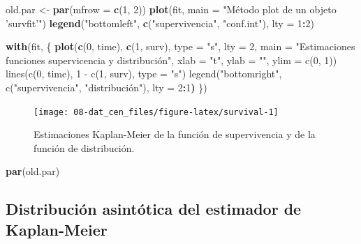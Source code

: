 \documentclass[]{book}
\newenvironment{Shaded}{\begin{snugshade}}{\end{snugshade}}
\newcommand{\KeywordTok}[1]{\textcolor[rgb]{0.13,0.29,0.53}{\textbf{#1}}}
\newcommand{\DataTypeTok}[1]{\textcolor[rgb]{0.13,0.29,0.53}{#1}}
\newcommand{\DecValTok}[1]{\textcolor[rgb]{0.00,0.00,0.81}{#1}}
\newcommand{\StringTok}[1]{\textcolor[rgb]{0.31,0.60,0.02}{#1}}
\newcommand{\OperatorTok}[1]{\textcolor[rgb]{0.81,0.36,0.00}{\textbf{#1}}}
\newcommand{\ErrorTok}[1]{\textcolor[rgb]{0.64,0.00,0.00}{\textbf{#1}}}
\newcommand{\NormalTok}[1]{#1}
\theoremstyle{definition}
\theoremstyle{definition}
\theoremstyle{definition}
\theoremstyle{remark}
\begin{document}
\begin{Shaded}
\begin{Highlighting}[]
\NormalTok{old.par <-}\StringTok{ }\KeywordTok{par}\NormalTok{(}\DataTypeTok{mfrow =} \KeywordTok{c}\NormalTok{(}\DecValTok{1}\NormalTok{, }\DecValTok{2}\NormalTok{))}
\KeywordTok{plot}\NormalTok{(fit, }\DataTypeTok{main =} \StringTok{"Método plot de un objeto 'survfit'"}\NormalTok{)}
\KeywordTok{legend}\NormalTok{(}\StringTok{"bottomleft"}\NormalTok{,  }\KeywordTok{c}\NormalTok{(}\StringTok{"supervivencia"}\NormalTok{, }\StringTok{"conf.int"}\NormalTok{), }\DataTypeTok{lty =} \DecValTok{1}\OperatorTok{:}\DecValTok{2}\NormalTok{)}

\KeywordTok{with}\NormalTok{(fit, \{}
  \KeywordTok{plot}\NormalTok{(}\KeywordTok{c}\NormalTok{(}\DecValTok{0}\NormalTok{, time), }\KeywordTok{c}\NormalTok{(}\DecValTok{1}\NormalTok{, surv), }\DataTypeTok{type =} \StringTok{"s"}\NormalTok{, }\DataTypeTok{lty =} \DecValTok{2}\NormalTok{,}
       \DataTypeTok{main =} \StringTok{"Estimaciones funciones supervicencia y distribución", }
\StringTok{       xlab = "}\NormalTok{t}\StringTok{", ylab = "", ylim = c(0, 1))}
\StringTok{  lines(c(0, time), 1 - c(1, surv), type = "}\NormalTok{s}\StringTok{")}
\StringTok{  legend("}\NormalTok{bottomright}\StringTok{",  c("}\NormalTok{supervivencia}\StringTok{", "}\NormalTok{distribución"), lty =}\StringTok{ }\DecValTok{2}\OperatorTok{:}\DecValTok{1}\ErrorTok{)}
\NormalTok{\})}
\end{Highlighting}
\end{Shaded}

\begin{figure}[!htb]

{\centering \texttt{[image: 08-dat\_cen\_files/figure-latex/survival-1]} 

}

\caption{Estimaciones Kaplan-Meier de la función de supervivencia y de la función de distribución.}\label{fig:survival}
\end{figure}

\begin{Shaded}
\begin{Highlighting}[]
\KeywordTok{par}\NormalTok{(old.par)}
\end{Highlighting}
\end{Shaded}

\subsection{Distribución asintótica del estimador de
Kaplan-Meier}\label{distribucion-asintotica-del-estimador-de-kaplan-meier}
\end{document}
